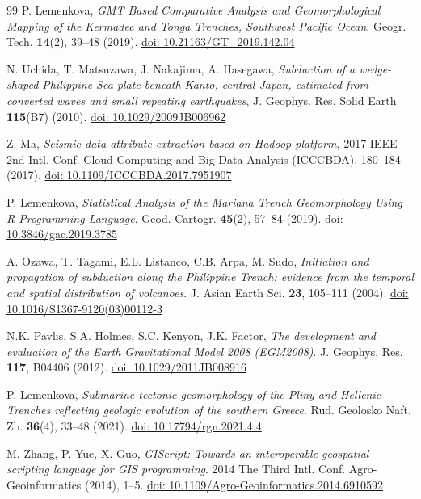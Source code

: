 \documentclass{rrparticle}
\begin{document}
\begin{thebibliography}{99}
 P. Lemenkova, \emph{GMT Based Comparative Analysis and Geomorphological Mapping of the Kermadec and Tonga Trenches, Southwest Pacific Ocean}. Geogr. Tech. \textbf{14}(2), 39--48 (2019). \href{https://doi.org/10.21163/GT_2019.142.04}{doi: 10.21163/GT\_2019.142.04}

 N. Uchida, T. Matsuzawa, J. Nakajima, A. Hasegawa, \emph{Subduction of a wedge-shaped Philippine Sea plate beneath Kanto, central Japan, estimated from converted waves and small repeating earthquakes}, J. Geophys. Res. Solid Earth \textbf{115}(B7) (2010). \href{https://doi.org/10.1029/2009JB006962}{doi: 10.1029/2009JB006962}

 Z. Ma, \emph{Seismic data attribute extraction based on Hadoop platform}, 2017 IEEE 2nd Intl. Conf. Cloud Computing and Big Data Analysis (ICCCBDA), 180--184 (2017). \href{https://doi.org/10.1109/ICCCBDA.2017.7951907}{doi: 10.1109/ICCCBDA.2017.7951907}

 P. Lemenkova, \emph{Statistical Analysis of the Mariana Trench Geomorphology Using R Programming Language}. Geod. Cartogr. \textbf{45}(2), 57--84 (2019). \href{https://doi.org/10.3846/gac.2019.3785}{doi: 10.3846/gac.2019.3785}

 A. Ozawa, T. Tagami, E.L. Listanco, C.B. Arpa, M. Sudo, \emph{Initiation and propagation of subduction along the Philippine Trench: evidence from the temporal and spatial distribution of volcanoes}. J. Asian Earth Sci. \textbf{23}, 105--111 (2004). \href{https://doi.org/10.1016/S1367-9120(03)00112-3}{doi: 10.1016/S1367-9120(03)00112-3}

 N.K. Pavlis, S.A. Holmes, S.C. Kenyon, J.K. Factor, \emph{The development and evaluation of the Earth Gravitational Model 2008 (EGM2008)}. J. Geophys. Res. \textbf{117}, B04406 (2012). \href{https://doi.org/10.1029/2011JB008916}{doi: 10.1029/2011JB008916}

 P. Lemenkova, \emph{Submarine tectonic geomorphology of the Pliny and Hellenic Trenches reflecting geologic evolution of the southern Greece}. Rud. Geolosko Naft. Zb. \textbf{36}(4), 33--48 (2021). \href{https://doi.org/10.17794/rgn.2021.4.4}{doi: 10.17794/rgn.2021.4.4}

 M. Zhang, P. Yue, X. Guo, \emph{GIScript: Towards an interoperable geospatial scripting language for GIS programming}. 2014 The Third Intl. Conf. Agro-Geoinformatics (2014), 1--5.  \href{https://doi.org/10.1109/Agro-Geoinformatics.2014.6910592}{doi: 10.1109/Agro-Geoinformatics.2014.6910592}


\end{thebibliography}
\end{document}

